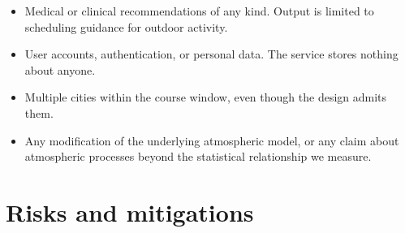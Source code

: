 \documentclass[11pt,a4paper]{article}
\begin{document}
\begin{itemize}[leftmargin=0.7cm]
  \item Medical or clinical recommendations of any kind.
    Output is limited to scheduling guidance for outdoor
    activity.
  \item User accounts, authentication, or personal data.
    The service stores nothing about anyone.
  \item Multiple cities within the course window, even
    though the design admits them.
  \item Any modification of the underlying atmospheric
    model, or any claim about atmospheric processes
    beyond the statistical relationship we measure.
\end{itemize}

\section{Risks and mitigations}
\end{document}
